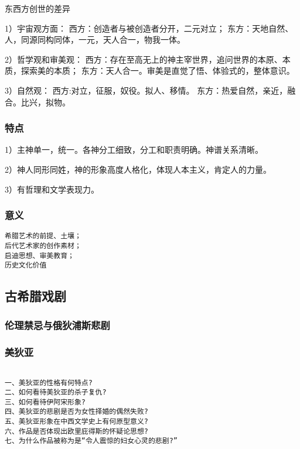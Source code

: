 \documentclass[UTF8]{../../RepresentationUniverse}
\begin{document}
\begin{proposition}
    东西方创世的差异

    1）宇宙观方面：
    西方：创造者与被创造者分开，二元对立；
    东方：天地自然、人，同源同构同体，一元，天人合一，物我一体。

    2）哲学观和审美观：
    西方：存在至高无上的神主宰世界，追问世界的本原、本质，探索美的本质；
    东方：天人合一。审美是直觉了悟、体验式的，整体意识。

    3）自然观：
    西方:对立，征服，奴役。拟人、移情。
    东方：热爱自然，亲近，融合。比兴，拟物。
\end{proposition}




\subsubsection{特点}
1）主神单一，统一。各神分工细致，分工和职责明确。神谱关系清晰。

2）神人同形同姓，神的形象高度人格化，体现人本主义，肯定人的力量。

3）有哲理和文学表现力。


\subsubsection{意义}

\begin{lstlisting}
希腊艺术的前提、土壤；
后代艺术家的创作素材；
启迪思想、审美教育；
历史文化价值
\end{lstlisting}


\subsection{古希腊戏剧}

\subsubsection{伦理禁忌与俄狄浦斯悲剧}

\subsubsection{美狄亚}

\begin{lstlisting}

一、美狄亚的性格有何特点?
二、如何看待美狄亚的杀子复仇?
三、如何看待伊阿宋形象?
四、美狄亚的悲剧是否为女性择婚的偶然失败?
五、美狄亚形象在中西文学史上有何原型意义?
六、作品是否体现出欧里庇得斯的怀疑论思想?
七、为什么作品被称为是“令人震惊的妇女心灵的悲剧?”

\end{lstlisting}
\end{document}
